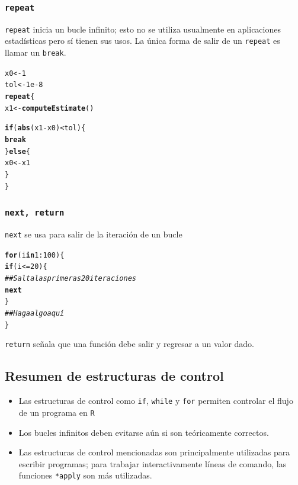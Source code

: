 \documentclass{article}\usepackage[]{graphicx}\usepackage[]{color}
\makeatletter
\newcommand{\hlnum}[1]{\textcolor[rgb]{0.686,0.059,0.569}{#1}}%
\newcommand{\hlcom}[1]{\textcolor[rgb]{0.678,0.584,0.686}{\textit{#1}}}%
\newcommand{\hlopt}[1]{\textcolor[rgb]{0,0,0}{#1}}%
\newcommand{\hlstd}[1]{\textcolor[rgb]{0.345,0.345,0.345}{#1}}%
\newcommand{\hlkwa}[1]{\textcolor[rgb]{0.161,0.373,0.58}{\textbf{#1}}}%
\newcommand{\hlkwb}[1]{\textcolor[rgb]{0.69,0.353,0.396}{#1}}%
\newcommand{\hlkwd}[1]{\textcolor[rgb]{0.737,0.353,0.396}{\textbf{#1}}}%
\newenvironment{kframe}{%
 \def\at@end@of@kframe{}%
 \ifinner\ifhmode%
  \def\at@end@of@kframe{\end{minipage}}%
  \begin{minipage}{\columnwidth}%
 \fi\fi%
 \def\FrameCommand##1{\hskip\@totalleftmargin \hskip-\fboxsep
 \colorbox{shadecolor}{##1}\hskip-\fboxsep
     \hskip-\linewidth \hskip-\@totalleftmargin \hskip\columnwidth}%
 \MakeFramed {\advance\hsize-\width
   \@totalleftmargin\z@ \linewidth\hsize
   \@setminipage}}%
 {\par\unskip\endMakeFramed%
 \at@end@of@kframe}
\newenvironment{knitrout}{}{} %
\makeatother
\begin{document}
    \subsubsection{\texttt{repeat}}
    \texttt{repeat} inicia un bucle infinito; esto no se utiliza usualmente en aplicaciones estadísticas pero sí tienen sus usos. La única forma de salir de un \texttt{repeat} es llamar un \texttt{break}.
\begin{knitrout}
\color{fgcolor}\begin{kframe}
\begin{alltt}
  \hlstd{x0} \hlkwb{<-} \hlnum{1}
  \hlstd{tol} \hlkwb{<-} \hlnum{1e-8}
  \hlkwa{repeat} \hlstd{\{}
    \hlstd{x1} \hlkwb{<-} \hlkwd{computeEstimate}\hlstd{()}

    \hlkwa{if}\hlstd{(}\hlkwd{abs}\hlstd{(x1} \hlopt{-} \hlstd{x0)} \hlopt{<} \hlstd{tol) \{}
      \hlkwa{break}
    \hlstd{\}} \hlkwa{else} \hlstd{\{}
      \hlstd{x0} \hlkwb{<-} \hlstd{x1}
    \hlstd{\}}
  \hlstd{\}}
\end{alltt}
\end{kframe}
\end{knitrout}

    \subsubsection{\texttt{next, return}}
    \texttt{next} se usa para salir de la iteración de un bucle
\begin{knitrout}
\color{fgcolor}\begin{kframe}
\begin{alltt}
    \hlkwa{for}\hlstd{(i} \hlkwa{in} \hlnum{1}\hlopt{:}\hlnum{100}\hlstd{) \{}
      \hlkwa{if}\hlstd{(i} \hlopt{<=} \hlnum{20}\hlstd{)\{}
        \hlcom{## Salta las primeras 20 iteraciones}
        \hlkwa{next}
      \hlstd{\}}
      \hlcom{## Haga algo aquí}
    \hlstd{\}}
\end{alltt}
\end{kframe}
\end{knitrout}
    \texttt{return} señala que una función debe salir y regresar a un valor dado.
    
  \subsection{Resumen de estructuras de control}
  \begin{itemize}
    \item Las estructuras de control como \texttt{if}, \texttt{while} y \texttt{for} permiten controlar el flujo de un programa en \texttt{R}
    \item Los bucles infinitos deben evitarse aún si son teóricamente correctos.
    \item Las estructuras de control mencionadas son principalmente utilizadas para escribir programas; para trabajar interactivamente líneas de comando, las funciones \texttt{*apply} son más utilizadas.
  \end{itemize}
\end{document}
